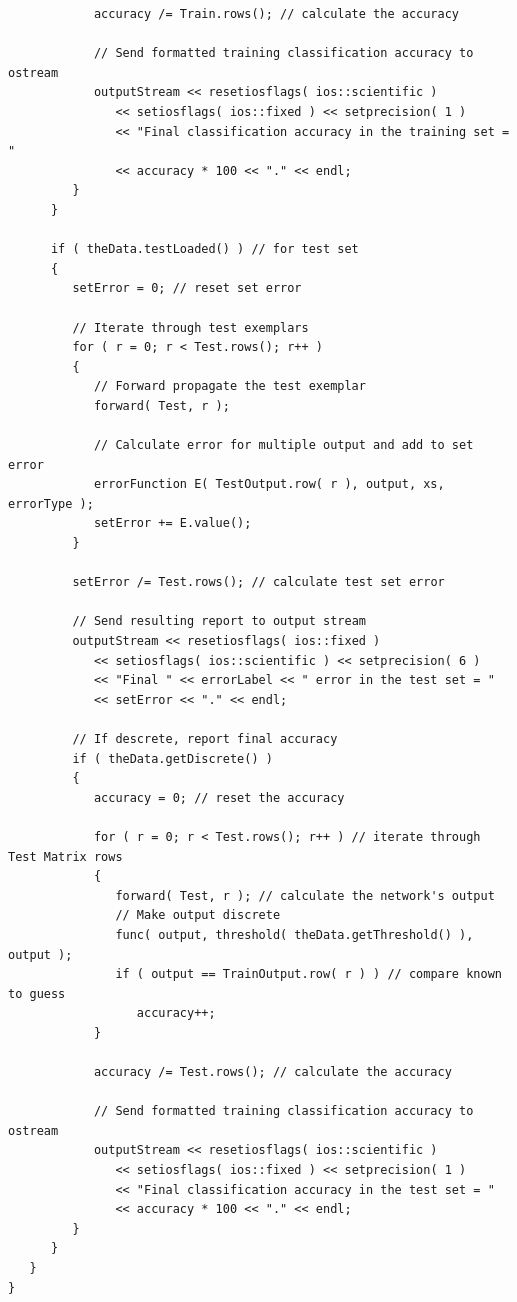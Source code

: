 \documentclass{report}[10pt]
\begin{document}
\begin{verbatim}
            accuracy /= Train.rows(); // calculate the accuracy

            // Send formatted training classification accuracy to ostream
            outputStream << resetiosflags( ios::scientific )
               << setiosflags( ios::fixed ) << setprecision( 1 )
               << "Final classification accuracy in the training set = "
               << accuracy * 100 << "." << endl;
         }      
      }

      if ( theData.testLoaded() ) // for test set
      {
         setError = 0; // reset set error

         // Iterate through test exemplars
         for ( r = 0; r < Test.rows(); r++ )
         {
            // Forward propagate the test exemplar
            forward( Test, r );

            // Calculate error for multiple output and add to set error
            errorFunction E( TestOutput.row( r ), output, xs, errorType );
            setError += E.value();
         }            
            
         setError /= Test.rows(); // calculate test set error            
            
         // Send resulting report to output stream
         outputStream << resetiosflags( ios::fixed )
            << setiosflags( ios::scientific ) << setprecision( 6 )
            << "Final " << errorLabel << " error in the test set = "
            << setError << "." << endl;

         // If descrete, report final accuracy
         if ( theData.getDiscrete() )
         {
            accuracy = 0; // reset the accuracy

            for ( r = 0; r < Test.rows(); r++ ) // iterate through Test Matrix rows
            {
               forward( Test, r ); // calculate the network's output
               // Make output discrete
               func( output, threshold( theData.getThreshold() ), output );
               if ( output == TrainOutput.row( r ) ) // compare known to guess
                  accuracy++;
            }

            accuracy /= Test.rows(); // calculate the accuracy

            // Send formatted training classification accuracy to ostream
            outputStream << resetiosflags( ios::scientific )
               << setiosflags( ios::fixed ) << setprecision( 1 )
               << "Final classification accuracy in the test set = "
               << accuracy * 100 << "." << endl;
         }
      }
   }
}


\end{verbatim}
\end{document}
